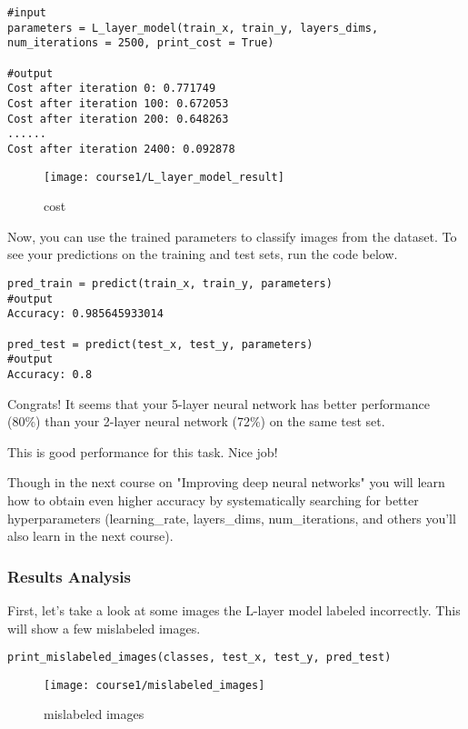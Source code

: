 \begin{verbatim}
#input
parameters = L_layer_model(train_x, train_y, layers_dims, num_iterations = 2500, print_cost = True)

#output
Cost after iteration 0: 0.771749
Cost after iteration 100: 0.672053
Cost after iteration 200: 0.648263
......
Cost after iteration 2400: 0.092878
\end{verbatim}
\begin{figure}[h]
\begin{center}
\texttt{[image: course1/L\_layer\_model\_result]}
\caption{cost}
\label{L_layer_model_result}
\end{center}
\end{figure}

Now, you can use the trained parameters to classify images from the dataset. To see your predictions on the training and test sets, run the code below.
\begin{verbatim}
pred_train = predict(train_x, train_y, parameters)
#output
Accuracy: 0.985645933014

pred_test = predict(test_x, test_y, parameters)
#output
Accuracy: 0.8
\end{verbatim}


Congrats! It seems that your 5-layer neural network has better performance (80\%) than your 2-layer neural network (72\%) on the same test set.

This is good performance for this task. Nice job!

Though in the next course on "Improving deep neural networks" you will learn how to obtain even higher accuracy by systematically searching for better hyperparameters (learning\_rate, layers\_dims, num\_iterations, and others you'll also learn in the next course).



\subsubsection{Results Analysis}

First, let's take a look at some images the L-layer model labeled incorrectly. This will show a few mislabeled images.
\begin{verbatim}
print_mislabeled_images(classes, test_x, test_y, pred_test)
\end{verbatim}

\begin{figure}[H]
  \centering
  \texttt{[image: course1/mislabeled\_images]} 
  \caption{mislabeled images}
\end{figure}

